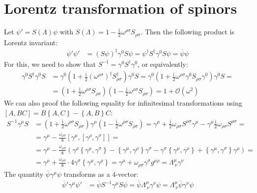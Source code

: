 \documentclass[english, parskip=full]{scrartcl}
\newcommand{\kla}{}
\newcommand{\klam}{}
\newcommand{\klammer}{}
\def\I{\text{i}}
\begin{document}
\section{Lorentz transformation of spinors}
Let $\psi'=S(\Lambda)\psi$ with $S(\Lambda)=1-\frac{\I}{2}\omega^{\rho\sigma}S_{\rho\sigma}$. Then the following product is Lorentz invariant:
\begin{align*}
\overline{\psi}'\psi'&=(S\psi)^\dagger\gamma^0S\psi=\psi^\dagger S^\dagger\gamma^0S\psi=\overline{\psi}\psi
\end{align*}
For this, we need to show that $S^{-1}=\gamma^0S^\dagger\gamma^0$, or equivalently:
\begin{align*}
\gamma^0S^\dagger\gamma^0S&=\gamma^0\kla\left( {1+\frac{\I}{2}(\omega^{\rho\sigma})^\dagger S_{\rho\sigma}^\dagger} \right)\gamma^0S=\gamma^0\kla\left( {1+\frac{\I}{2}\omega^{\rho\sigma}\gamma^0S_{\rho\sigma}\gamma^0} \right)\gamma^0S=\\
&=\kla\left( {1+\frac{\I}{2}\omega^{\rho\sigma}S_{\rho\sigma}} \right)\kla\left( {1-\frac{\I}{2}\omega^{\rho\sigma}S_{\rho\sigma}} \right)=1+\mathcal{O}(\omega^2)
\end{align*}
We can also proof the following equality for infinitesimal transformations using $\klam\left[ {A,BC} \right]=B\klammer\left\{{A,C} \right\}-\klammer\left\{{A,B} \right\}C$:
\begin{align*}
S^{-1}\gamma^\mu S&=\kla\left( {1+\frac{\I}{2}\omega^{\rho\sigma}S_{\rho\sigma}} \right)\gamma^\mu\kla\left( {1-\frac{\I}{2}\omega^{\rho\sigma}S_{\rho\sigma}} \right)=\gamma^\mu +\frac{\I}{2}\omega_{\rho\sigma}S^{\rho\sigma}\gamma^\mu - \gamma^\mu \frac{\I}{2}\omega_{\rho\sigma}S^{\rho\sigma}=\\
&=\gamma^\mu -\frac{\omega_{\rho\sigma}}{8}\klam\left[ {\gamma^\mu, \klam\left[ {\gamma^\rho,\gamma^\sigma} \right]} \right]=\\
&=\gamma^\mu -\frac{\omega_{\rho\sigma}}{8}\kla\left( {\gamma^\rho\klammer\left\{{\gamma^\mu,\gamma^\sigma} \right\}-\klammer\left\{{\gamma^\mu,\gamma^\rho} \right\}\gamma^\sigma - \gamma^\sigma\klammer\left\{{\gamma^\mu,\gamma^\rho} \right\}+\klammer\left\{{\gamma^\mu,\gamma^\sigma} \right\}\gamma^\rho} \right)=\\
&=\gamma^\mu + \frac{\omega_{\rho\sigma}}{8}\cdot 4\gamma^\sigma\klammer\left\{{\gamma^\mu,\gamma^\rho} \right\}=\gamma^\mu +\omega_{\rho\sigma}\gamma^\sigma g^{\mu\rho}=\Lambda^\mu_{\ \nu}\gamma^\nu
\end{align*}
The quantity $\overline{\psi}\gamma^\mu\psi$ transforms as a 4-vector:
\begin{align*}
\overline{\psi}'\gamma^\mu\psi'&=\overline{\psi}S^{-1}\gamma^\mu S\psi=\overline{\psi}\Lambda^\mu_{\ \nu}\gamma^\nu\psi=\Lambda^\mu_{\ \nu}\overline{\psi}\gamma^\nu\psi
\end{align*}
\end{document}
